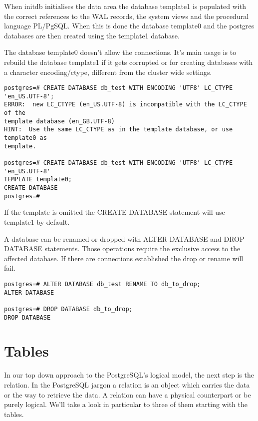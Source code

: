 When initdb initialises the data area the database template1 is populated with the correct
references to the WAL records, the system views and the procedural language PL/PgSQL. When
this is done the database template0 and the postgres databases are then created using the template1
database.

The database template0 doesn't allow the connections. It's main usage is to rebuild the
database template1 if it gets corrupted or for creating databases with a character encoding/ctype,
different from the cluster wide settings.

\begin{lstlisting}[style=pgsql]
postgres=# CREATE DATABASE db_test WITH ENCODING 'UTF8' LC_CTYPE 'en_US.UTF-8';
ERROR:  new LC_CTYPE (en_US.UTF-8) is incompatible with the LC_CTYPE of the
template database (en_GB.UTF-8)
HINT:  Use the same LC_CTYPE as in the template database, or use template0 as
template.

postgres=# CREATE DATABASE db_test WITH ENCODING 'UTF8' LC_CTYPE 'en_US.UTF-8'
TEMPLATE template0;
CREATE DATABASE
postgres=#

\end{lstlisting}

If the template is omitted the CREATE DATABASE statement will use template1 by default.


A database can be renamed or dropped with ALTER DATABASE and DROP DATABASE  statements. Those operations require the exclusive access to the
affected database. If there are connections established the drop or rename will fail.

\begin{lstlisting}[style=pgsql]
postgres=# ALTER DATABASE db_test RENAME TO db_to_drop;
ALTER DATABASE

postgres=# DROP DATABASE db_to_drop;
DROP DATABASE

\end{lstlisting}




\section{Tables}
\label{sec:TABLES}
In our top down approach to the PostgreSQL's logical model, the next step is the relation.
In the PostgreSQL jargon a relation is an object which carries the data or the way to
retrieve the data. A relation can have a physical counterpart or be purely logical. We'll take a
look in particular to three of them starting with the tables.\newline

